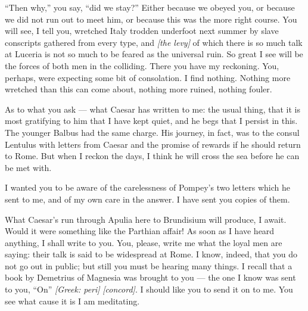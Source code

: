  ``Then why,'' you say, ``did we stay?'' Either because we obeyed you, or because we did not run out to meet him, or because this was the more right course. You will see, I tell you, wretched Italy trodden underfoot next summer by slave conscripts gathered from every type, and \textit{[the levy]} of which there is so much talk at Luceria is not so much to be feared as the universal ruin. So great I see will be the forces of both men in the colliding. There you have my reckoning. You, perhaps, were expecting some bit of consolation. I find nothing. Nothing more wretched than this can come about, nothing more ruined, nothing fouler.

 As to what you ask --- what Caesar has written to me: the usual thing, that it is most gratifying to him that I have kept quiet, and he begs that I persist in this. The younger Balbus had the same charge. His journey, in fact, was to the consul Lentulus with letters from Caesar and the promise of rewards if he should return to Rome. But when I reckon the days, I think he will cross the sea before he can be met with.

 I wanted you to be aware of the carelessness of Pompey's two letters which he sent to me, and of my own care in the answer. I have sent you copies of them.

 What Caesar's run through Apulia here to Brundisium will produce, I await. Would it were something like the Parthian affair! As soon as I have heard anything, I shall write to you. You, please, write me what the loyal men are saying: their talk is said to be widespread at Rome. I know, indeed, that you do not go out in public; but still you must be hearing many things. I recall that a book by Demetrius of Magnesia was brought to you --- the one I know was sent to you, ``On'' \textit{[Greek: peri]} \textit{[concord]}. I should like you to send it on to me. You see what cause it is I am meditating.

